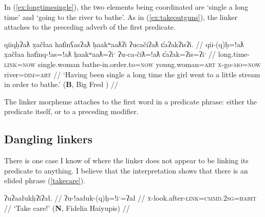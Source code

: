 In (\ref{ex:longtimesingle}), the two elements being coordinated are `single a long time' and `going to the river to bathe'. As in (\ref{ex:takeoutguns}), the linker attaches to the preceding adverb of the first predicate.

\ex \label{ex:longtimesingle}
\begingl
\glpreamble qiiqḥʔaƛ x̣ačłaa hat̓inʕasʔaƛ ḥaakʷaaƛʔi ʔucačiʔaƛ c̓aʔakʔisʔi. //
\gla qii-(q)ḥ=!aƛ x̣ačłaa hat̓inq-!as=!aƛ ḥaakʷaaƛ=ʔiˑ ʔu-ca-čiƛ=!aƛ c̓aʔak=ʔis=ʔiˑ //
\glb long.time-\textsc{link}=\textsc{now} single.woman bathe-in.order.to=\textsc{now} young.woman=\textsc{art} \textsc{x}-go-\textsc{mo}=\textsc{now} river=\textsc{dim}=\textsc{art} //
\glft `Having been single a long time the girl went to a little stream in order to bathe.' (\textbf{B}, Big Fred \citealt[68]{sapir1939}) //
\endgl
\xe

The linker morpheme attaches to the first word in a predicate phrase: either the predicate itself, or to a preceding modifier.


\subsection{Dangling linkers} \label{ch:link:dangling}

There is one case I know of where the linker does not appear to be linking its predicate to anything. I believe that the interpretation shows that there is an elided phrase (\ref{takecare}).

\ex \label{takecare}
\begingl
\glpreamble ʔuʔaałukḥʔiʔał.\footnotemark{} //
\gla ʔu-!aałuk-(q)ḥ=!iˑ=ʔał //
\glb \textsc{x}-look.after-\textsc{link}=\textsc{cmmd.2sg}=\textsc{habit} //
\glft `Take care!' (\textbf{N}, Fidelia Haiyupis) //
\endgl
\xe


